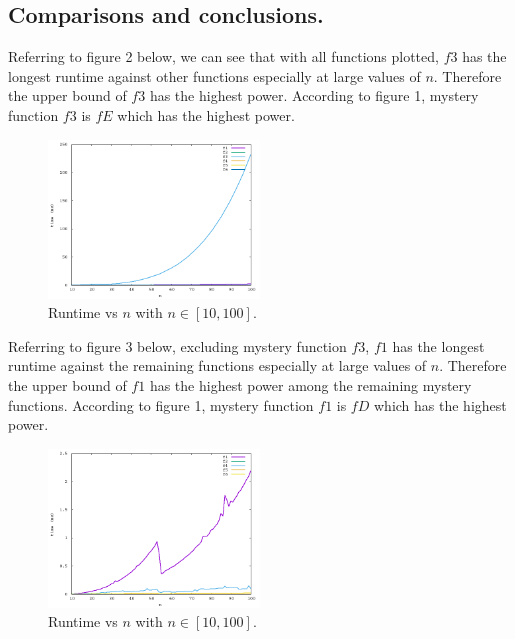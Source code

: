\documentclass{article}
\begin{document}
	\subsection{Comparisons and conclusions.}
	Referring to figure 2 below, we can see that with all functions plotted, $f3$ has the longest runtime against other functions especially at large values of $n$. Therefore the upper bound of $f3$ has the highest power. According to figure 1, mystery function $f3$ is $fE$ which has the highest power. 
	\begin{figure}[H]
	    \begin{center}
	       \includegraphics[width=0.5\textwidth]{Evidence_1.png}
	    \end{center}
    	\caption{Runtime vs $n$ with $n\in [10,100]$.}
	\end{figure}
	
	Referring to figure 3 below, excluding mystery function $f3$, $f1$ has the longest runtime against the remaining functions especially at large values of $n$. Therefore the upper bound of $f1$ has the highest power among the remaining mystery functions. According to figure 1, mystery function $f1$ is $fD$ which has the highest power. 
	\begin{figure}[H]
		\begin{center}
			\includegraphics[width=0.5\textwidth]{Evidence_2.png}
		\end{center}
		\caption{Runtime vs $n$ with $n\in [10,100]$.}
	\end{figure}
	
\end{document}
